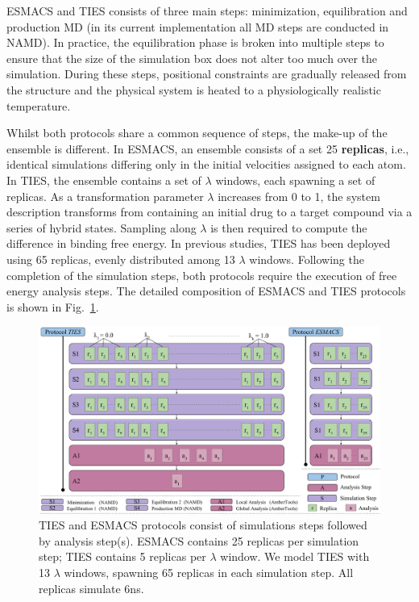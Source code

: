 ESMACS and TIES consists of three main steps: minimization, equilibration and
production MD (in its current implementation all MD steps are conducted in NAMD\cite{Phillips2005}). In practice, the equilibration phase is broken into multiple
steps to ensure that the size of the simulation box does not alter too much
over the simulation. During these steps, positional constraints are gradually
released from the structure and the physical system is heated to a
physiologically realistic temperature.

Whilst both protocols share a common sequence of steps, the make-up of the
ensemble is different. In ESMACS, an ensemble consists of a set 25
\textbf{replicas}, i.e., identical simulations differing only in the initial
velocities assigned to each atom. In TIES, the ensemble contains a set of
\textbf{$\lambda$} windows, each spawning a set of replicas. As a
transformation parameter $\lambda$ increases from 0 to 1, the system
description transforms from containing an initial drug to a target compound
via a series of hybrid states. Sampling along $\lambda$ is then required to
compute the difference in binding free energy. In previous studies, TIES has
been deployed using 65 replicas, evenly distributed among 13 $\lambda$
windows. Following the completion of the simulation steps, both protocols
require the execution of free energy analysis steps. The detailed composition
of ESMACS and TIES protocols is shown in
Fig.~\ref{fig:ties_esmacs_application}.

\begin{figure}
  \centering
  \includegraphics[width=\columnwidth]{figures/ties_esmacs_application_model.pdf}
  \caption{TIES and ESMACS protocols consist of simulations steps followed by
  analysis step(s). ESMACS contains 25 replicas per simulation step; TIES
  contains %
  5 replicas per $\lambda$ window. We model TIES with 13 $\lambda$
  windows, spawning 65 replicas in each simulation step. All replicas
  simulate 6ns.}\label{fig:ties_esmacs_application}
\up{}
\up{}
\end{figure}

